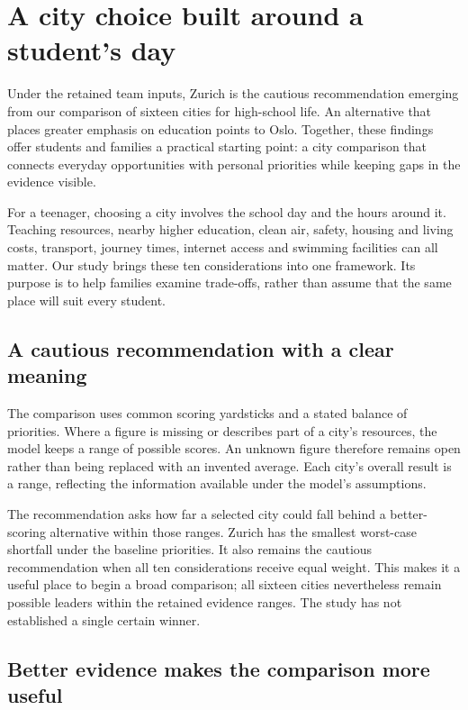 \section*{A city choice built around a student's day}

Under the retained team inputs, Zurich is the cautious recommendation emerging from our comparison of sixteen cities for high-school life. An alternative that places greater emphasis on education points to Oslo. Together, these findings offer students and families a practical starting point: a city comparison that connects everyday opportunities with personal priorities while keeping gaps in the evidence visible.

For a teenager, choosing a city involves the school day and the hours around it. Teaching resources, nearby higher education, clean air, safety, housing and living costs, transport, journey times, internet access and swimming facilities can all matter. Our study brings these ten considerations into one framework. Its purpose is to help families examine trade-offs, rather than assume that the same place will suit every student.

\subsection*{A cautious recommendation with a clear meaning}

The comparison uses common scoring yardsticks and a stated balance of priorities. Where a figure is missing or describes part of a city's resources, the model keeps a range of possible scores. An unknown figure therefore remains open rather than being replaced with an invented average. Each city's overall result is a range, reflecting the information available under the model's assumptions.

The recommendation asks how far a selected city could fall behind a better-scoring alternative within those ranges. Zurich has the smallest worst-case shortfall under the baseline priorities. It also remains the cautious recommendation when all ten considerations receive equal weight. This makes it a useful place to begin a broad comparison; all sixteen cities nevertheless remain possible leaders within the retained evidence ranges. The study has not established a single certain winner.

\subsection*{Better evidence makes the comparison more useful}

